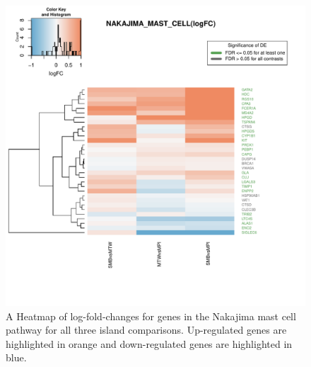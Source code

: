 \documentclass[12pt,a4paper,titlepage,twoside,openright]{book}
\begin{document}
\begin{mainmatter}
{\begin{figure}[htb!]
\centering
\includegraphics[width=\textwidth,height=\textheight,keepaspectratio]{Figures/c2_ComparisonHeatmap_NAKAJIMA_MAST_CELL.pdf}
\caption{ A Heatmap of log-fold-changes for genes in the Nakajima mast cell pathway for all three island comparisons. Up-regulated genes are highlighted in orange and down-regulated genes are highlighted in blue.}
\label{fig:Nakajima Mast Cell}
\end{figure}


}
\end{mainmatter}
\end{document}
